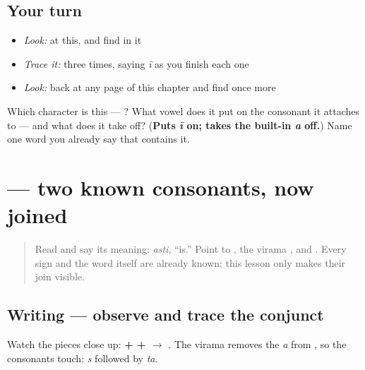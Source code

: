 \subsection*{Your turn}
\begin{itemize}
\raggedright
  \item \emph{Look:} at this, and find  in it
\end{itemize}

\begin{quote}
\end{quote}

\begin{itemize}
\raggedright
  \item \emph{Trace it:}  three times, saying \emph{ī} as you finish each one
  \item \emph{Look:} back at any page of this chapter and find  once more
\end{itemize}

\begin{tcolorbox}[breakable,colback=teal!4,colframe=teal!35!black,title={Before you move on}]
Which character is this — ? What vowel does it put on the consonant it attaches to — and what does it take off? (\textbf{Puts \emph{ī} on; takes the built-in \emph{a} off.}) Name one word you already say that contains it.
\end{tcolorbox}
\section[\texorpdfstring{\sk{स्त} (sta)}{स्त (sta)}]{ — two known consonants, now joined}

\label{lesson:SA-W10-st-conjunct-observe-trace}



\begin{quote}
Read \textbf{} and say its meaning: \emph{asti}, “is.” Point to \textbf{}, the virama \textbf{}, and \textbf{}. Every sign and the word itself are already known; this lesson only makes their join visible.
\end{quote}

\subsection*{Writing — observe and trace the conjunct}
Watch the pieces close up: \textbf{ +  +  $\to$ }. The virama removes the \emph{a} from \textbf{}, so the consonants touch: \emph{s} followed by \emph{ta}.

